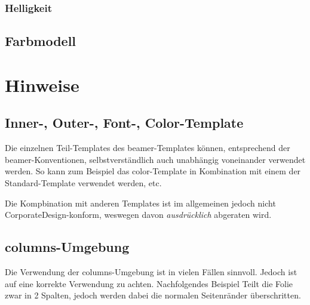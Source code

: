 \subsubsection{Helligkeit}

\begin{desctable}
\end{desctable}

\subsection{Farbmodell}

\begin{desctable}
\end{desctable}


\section{Hinweise}

\subsection{Inner-, Outer-, Font-, Color-Template}

Die einzelnen Teil-Templates des beamer-Templates können,
entsprechend der beamer-Konventionen, selbstverständlich
auch unabhängig voneinander verwendet werden.
So kann zum Beispiel das color-Template in Kombination mit einem der
Standard-Template verwendet werden, etc.

Die Kompbination mit anderen Templates ist im allgemeinen jedoch nicht
CorporateDesign-konform, weswegen davon \emph{ausdrücklich} abgeraten wird.

\subsection{columns-Umgebung}

Die Verwendung der columns-Umgebung ist in vielen Fällen sinnvoll.
Jedoch ist auf eine korrekte Verwendung zu achten.
Nachfolgendes Beispiel Teilt die Folie zwar in 2 Spalten,
jedoch werden dabei die normalen Seitenränder überschritten.

